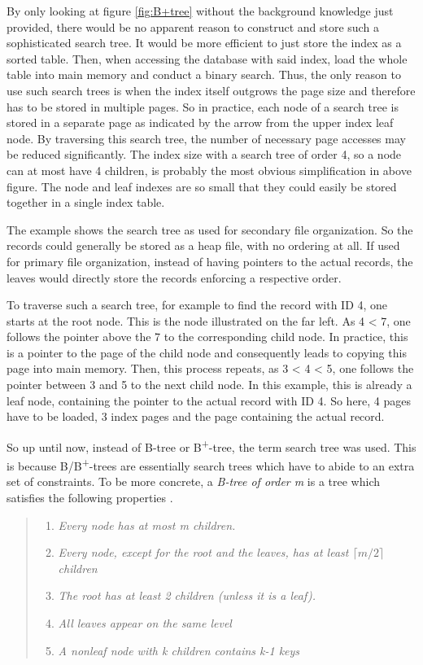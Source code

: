 By only looking at figure \ref{fig:B+tree} without the background knowledge just provided, there would be no apparent reason to construct and store such a sophisticated search tree. It would be more efficient to just store the index as a sorted table. Then, when accessing the database with said index, load the whole table into main memory and conduct a binary search. Thus, the only reason to use such search trees is when the index itself outgrows the page size and therefore has to be stored in multiple pages. So in practice, each node of a search tree is stored in a separate page as indicated by the arrow from the upper index leaf node. By traversing this search tree, the number of necessary page accesses may be reduced significantly. The index size with a search tree of order 4, so a node can at most have 4 children, is probably the most obvious simplification in above figure. The node and leaf indexes are so small that they could easily be stored together in a single index table.\par 
The example shows the search tree as used for secondary file organization. So the records could generally be stored as a heap file, with no ordering at all. If used for primary file organization, instead of having pointers to the actual records, the leaves would directly store the records enforcing a respective order.\par
To traverse such a search tree, for example to find the record with ID 4, one starts at the root node. This is the node illustrated on the far left. As 4 < 7, one follows the pointer above the 7 to the corresponding child node. In practice, this is a pointer to the page of the child node and consequently leads to copying this page into main memory. Then, this process repeats, as 3 < 4 < 5, one follows the pointer between 3 and 5 to the next child node. In this example, this is already a leaf node, containing the pointer to the actual record with ID 4. So here, 4 pages have to be loaded, 3 index pages and the page containing the actual record.\par
So up until now, instead of B-tree or B\textsuperscript{+}-tree, the term search tree was used. This is because B/B\textsuperscript{+}-trees are essentially search trees which have to abide to an extra set of constraints. To be more concrete, a \emph{B-tree of order m} is a tree which satisfies the following properties \cite{SortingSearchingBible}.

\begin{quote}
	\begin{enumerate}
		\item\textit{Every node has at most m children. }
		\item\textit{Every node, except for the root and the leaves, has at least $\lceil m/2 \rceil$ children}
		\item\textit{The root has at least 2 children (unless it is a leaf).}
		\item\textit{All leaves appear on the same level}
		\item\textit{A nonleaf node with k children contains k-1 keys}
	\end{enumerate}
\end{quote}

